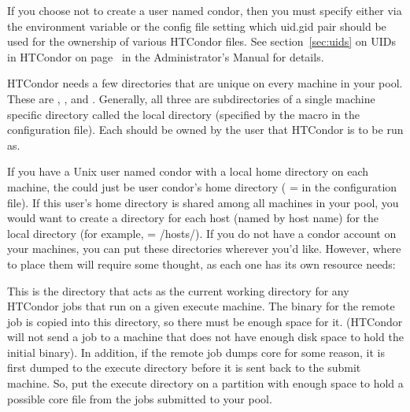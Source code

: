 \begin{description}
If you choose not to create a user named condor,
then you must specify either via the
 environment variable or the 
config file setting which uid.gid pair should be used for
the ownership of various HTCondor files.  
See section~\ref{sec:uids} on UIDs in HTCondor on
page~\pageref{sec:uids} in the Administrator's Manual for details.

\item[6. Where should the machine-specific directories for
HTCondor go?]

HTCondor needs a few directories that are unique on every machine in
your pool.  These are 
, 
, and 
.  Generally, all
three are subdirectories of a single machine specific directory called
the local directory (specified by the  macro
in the configuration file).
Each should be owned by the user that HTCondor is to be run as.

If you have a Unix user named condor with a local home directory on each
machine, the  could just be user condor's home
directory ( =  in the 
configuration file).
If this user's home directory is shared among all machines in your
pool, you would want to create a directory for each host (named by
host name) for the local directory (for example,  =
/hosts/).  If you do not
have a condor account on your machines, you can put these directories
wherever you'd like.
However, where to place them will require some
thought, as each one has its own resource needs:

\begin{description}
\item[\File{execute}] This is the directory that acts as the current working
directory for any HTCondor jobs that run on a given execute machine.
The binary for the remote job is copied into this directory, so
there
must be enough space for it.  (HTCondor will not send a job to a
machine that does not have enough disk space to hold the initial
binary).  In addition, if the remote job dumps core for some reason,
it is first dumped to the execute directory before it is sent back to
the submit machine.  So, put the execute directory on
a partition with enough space to hold a possible core file from the
jobs submitted to your pool.


\end{description}
\end{description}

